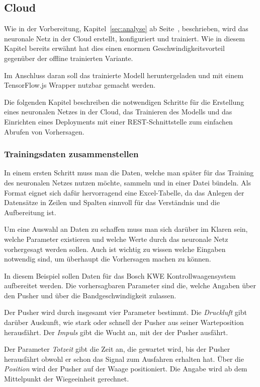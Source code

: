 \subsection{Cloud}
Wie in der Vorbereitung, Kapitel~\ref{sec:analyse} ab Seite~\pageref{sec:analyse}, beschrieben, wird das neuronale Netz
in der Cloud erstellt, konfiguriert und trainiert. Wie in diesem Kapitel bereits erwähnt hat dies einen enormen
Geschwindigkeitsvorteil gegenüber der offline trainierten Variante.

Im Anschluss daran soll das trainierte Modell heruntergeladen und mit einem TensorFlow.js Wrapper nutzbar gemacht
werden.

Die folgenden Kapitel beschreiben die notwendigen Schritte für die Erstellung eines neuronalen Netzes in der Cloud, das
Trainieren des Modells und das Einrichten eines Deployments mit einer REST-Schnittstelle zum einfachen Abrufen von
Vorhersagen.

\subsubsection{Trainingsdaten zusammenstellen}
In einem ersten Schritt muss man die Daten, welche man später für das Training des neuronalen Netzes nutzen möchte,
sammeln und in einer Datei bündeln. Als Format eignet sich dafür hervorragend eine Excel-Tabelle, da das Anlegen der
Datensätze in Zeilen und Spalten sinnvoll für das Verständnis und die Aufbereitung ist.

Um eine Auswahl an Daten zu schaffen muss man sich darüber im Klaren sein, welche Parameter existieren und welche Werte
durch das neuronale Netz vorhergesagt werden sollen. Auch ist wichtig zu wissen welche Eingaben notwendig sind, um
überhaupt die Vorhersagen machen zu können.

In diesem Beispiel sollen Daten für das Bosch KWE Kontrollwaagensystem aufbereitet werden. Die vorhersagbaren Parameter
sind die, welche Angaben über den Pusher und über die Bandgeschwindigkeit zulassen.

Der Pusher wird durch insgesamt vier Parameter bestimmt. Die \textit{Druckluft} gibt darüber Auskunft, wie stark oder
schnell der Pusher aus seiner Warteposition herausfährt. Der \textit{Impuls} gibt die Wucht an, mit der der Pusher
ausfährt.

Der Parameter \textit{Totzeit} gibt die Zeit an, die gewartet wird, bis der Pusher herausfährt obwohl er schon das
Signal zum Ausfahren erhalten hat. Über die \textit{Position} wird der Pusher auf der Waage positioniert. Die Angabe
wird ab dem Mittelpunkt der Wiegeeinheit gerechnet.

